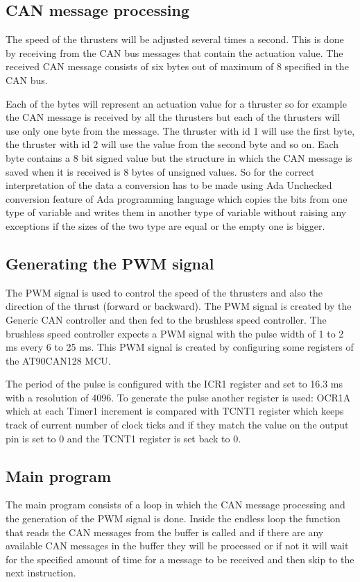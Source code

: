 \subsection{CAN message processing}
The speed of the thrusters will be adjusted several times a second. This is done by receiving from the CAN bus messages that contain the actuation value. The received CAN message consists of six bytes out of maximum of 8 specified in the CAN bus. 

Each of the bytes will represent an actuation value for a thruster so for example the CAN message is received by all the thrusters but each of the thrusters will use only one byte from the message. The thruster with id 1 will use the first byte, the thruster with id 2 will use the value from the second byte and so on. Each byte contains a 8 bit signed value but the structure in which the CAN message is saved when it is received is 8 bytes of unsigned values. So for the correct interpretation of the data a conversion has to be made using Ada Unchecked conversion feature of Ada programming language which copies the bits from one type of variable and writes them in another type of variable without raising any exceptions if the sizes of the two type are equal or the empty one is bigger.  
\subsection{Generating the PWM signal}
The PWM signal is used to control the speed of the thrusters and also the direction of the thrust (forward or backward). The PWM signal is created by the Generic CAN controller and then fed to the brushless speed controller. The brushless speed controller expects a PWM signal with the pulse width of 1 to 2 ms every 6 to 25 ms. This PWM signal is created by configuring some registers of the AT90CAN128 MCU.

 The period of the pulse is configured with the ICR1 register and set to 16.3 ms with a resolution of 4096. To generate the pulse another register is used: OCR1A which at each Timer1 increment is compared with TCNT1 register which keeps track of current number of clock ticks and if they match the value on the output pin is set to 0 and the TCNT1 register is set back to 0. 

\subsection{Main program}
The main program consists of a loop in which the CAN message processing and the generation of the PWM signal is done. Inside the endless loop the function that reads the CAN messages from the buffer is called and if there are any available CAN messages in the buffer they will be processed or if not it will wait for the specified amount of time for a message to be received and then skip to the next instruction.

 